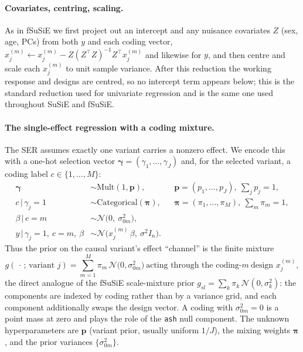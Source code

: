 \documentclass[11pt]{article}
\newcommand{\Cat}{\mathrm{Categorical}}
\newcommand{\Mult}{\mathrm{Mult}}
\newcommand{\Nor}{\mathcal{N}}
\newcommand{\given}{\,\vert\,}
\newcommand{\sigsq}{\sigma^{2}}
\newcommand{\sigz}[1]{\sigma_{0#1}^{2}}
\newcommand{\xjm}{x_j^{(m)}}
\theoremstyle{plain}
\theoremstyle{remark}
\begin{document}
\paragraph{Covariates, centring, scaling.} As in fSuSiE we first project out an
intercept and any nuisance covariates $Z$ (sex, age, PCs) from both $y$ and each
coding vector, $x_j^{(m)}\leftarrow x_j^{(m)}-Z(Z^{\!\top}Z)^{-1}Z^{\!\top}x_j^{(m)}$
and likewise for $y$, and then centre and scale each $x_j^{(m)}$ to unit sample
variance. After this reduction the working response and designs are centred, so
no intercept term appears below; this is the standard reduction used for
univariate regression and is the same one used throughout SuSiE and fSuSiE.

\paragraph{The single-effect regression with a coding mixture.} The SER assumes
exactly one variant carries a nonzero effect. We encode this with a one-hot
selection vector $\bm\gamma=(\gamma_1,\dots,\gamma_J)$ and, for the selected
variant, a coding label $c\in\{1,\dots,M\}$:
\begin{align}
  \bm\gamma &\sim \Mult(1,\bm p), && \bm p=(p_1,\dots,p_J),\ \textstyle\sum_j p_j=1,
    \label{eq:gen-gamma}\\
  c \given \gamma_j=1 &\sim \Cat(\bm\pi), && \bm\pi=(\pi_1,\dots,\pi_M),\
    \textstyle\sum_m\pi_m=1, \label{eq:gen-c}\\
  \beta \given c=m &\sim \Nor\!\big(0,\ \sigz{m}\big), \label{eq:gen-beta}\\
  y \given \gamma_j=1,\ c=m,\ \beta &\sim
    \Nor\!\big(\xjm\,\beta,\ \sigsq I_n\big). \label{eq:gen-y}
\end{align}
Thus the prior on the causal variant's effect ``channel'' is the finite mixture
\begin{equation}\label{eq:gprior}
  g(\,\cdot\,;\,\text{variant }j)=\sum_{m=1}^{M}\pi_m\,
     \Nor\!\big(0,\sigz{m}\big)\ \text{acting through the coding-}m\ \text{design }\xjm,
\end{equation}
the direct analogue of the fSuSiE scale-mixture prior
$g_{sl}=\sum_{k}\pi_k\,\Nor(0,\sigma_k^2)$: the components are indexed by coding
rather than by a variance grid, and each component additionally swaps the design
vector. A coding with $\sigz{m}=0$ is a point mass at zero and plays the role of
the \texttt{ash} null component. The unknown hyperparameters are $\bm p$ (variant
prior, usually uniform $1/J$), the mixing weights $\bm\pi$, and the prior
variances $\{\sigz{m}\}$.
\end{document}
